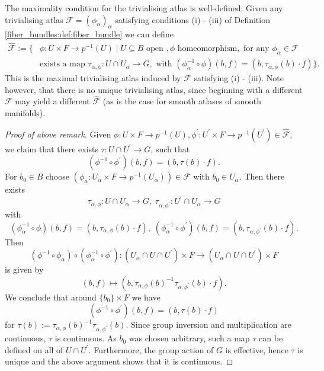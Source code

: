 \begin{remark}
    The maximality condition for the trivialising atlas is well-defined: Given any trivialising atlas $\mathcal{F} = (\phi_\alpha)_\alpha$ satisfying conditions (i) - (iii) of Definition \ref{fiber_bundles:def:fiber_bundle} we can define
    \begin{align*}
        \hat{\mathcal{F}} := \{& \phi \colon U \times F \to p^{-1}(U) \mid U \subseteq B \text{ open }, \phi \text{ homeomorphism},  \text{ for any } \phi_\alpha \in \mathcal{F} \\ &\text{exists a map } \tau_{\alpha,\phi} \colon U \cap U_\alpha \to G, \text{ with } (\phi_\alpha^{-1} \circ \phi)(b,f) = (b,\tau_{\alpha,\phi}(b) \cdot f) \}.
    \end{align*}
    This is the maximal trivialising atlas induced by $\mathcal{F}$ satisfying (i) - (iii). Note however, that there is no unique trivialising atlas, since beginning with a different $\mathcal{F}$ may yield a different $\hat{\mathcal{F}}$ (as is the case for smooth atlases of smooth manifolds).
    \begin{proof}[Proof of above remark]
        Given $\phi \colon U \times F \to p^{-1}(U), \phi^\prime \colon U^\prime \times F \to p^{-1}(U^\prime) \in \hat{\mathcal{F}}$, we claim that there exists $\tau \colon U \cap U^\prime \to G$, such that
        \[
        (\phi^{-1} \circ \phi^\prime)(b,f) = (b,\tau(b) \cdot f).
        \]
        For $b_0 \in B$ choose $(\phi_\alpha \colon U_\alpha \times F \to p^{-1}(U_\alpha)) \in \mathcal{F}$ with $b_0 \in U_\alpha$. Then there exists
        \[
        \tau_{\alpha,\phi} \colon U \cap U_\alpha \to G, \; \tau_{\alpha,\phi^\prime} \colon U^\prime \cap U_\alpha \to G
        \]
        with
        \[
        (\phi^{-1}_\alpha \circ \phi)(b,f) = (b,\tau_{\alpha,\phi}(b) \cdot f), \; 
        (\phi^{-1}_\alpha \circ \phi^\prime)(b,f) = (b,\tau_{\alpha,\phi^\prime}(b) \cdot f).
        \]
        Then
        \[
        (\phi^{-1} \circ \phi_\alpha) \circ (\phi_\alpha^{-1} \circ \phi^\prime) \colon (U_\alpha \cap U \cap U^\prime) \times F \to (U_\alpha \cap U \cap U^\prime) \times F 
        \]
        is given by
        \[
        (b,f) \mapsto (b, \tau_{\alpha,\phi}(b)^{-1}\tau_{\alpha,\phi^\prime}(b) \cdot f).
        \]
        We conclude that around $\{b_0\} \times F$ we have
        \[
        (\phi^{-1} \circ \phi^\prime)(b,f) = (b,\tau(b) \cdot f)
        \]
        for $\tau(b) := \tau_{\alpha,\phi}(b)^{-1}\tau_{\alpha,\phi^\prime}(b)$. Since group inversion and multiplication are continuous, $\tau$ is continuous. As $b_0$ was chosen arbitrary, such a map $\tau$ can be defined on all of $U \cap U^\prime$. Furthermore, the group action of $G$ is effective, hence $\tau$ is unique and the above argument shows that it is continuous. 
    \end{proof}
\end{remark}

